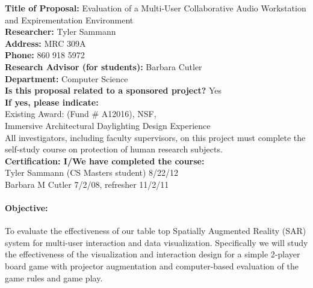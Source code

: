 \documentclass[10pt]{article}
\begin{document}
\noindent
{\bf Title of Proposal:}  Evaluation of a Multi-User Collaborative Audio Workstation and Expirementation Environment\\
{\bf Researcher:}   Tyler Sammann\\
{\bf Address:}  MRC 309A\\
{\bf Phone:} 860 918 5972\\
{\bf Research Advisor (for students):}  Barbara Cutler \\
{\bf Department:}  Computer Science \\
{\bf Is this proposal related to a sponsored project?}  Yes \\
{\bf If yes,  please indicate:}  \\
Existing Award: (Fund \# A12016), NSF, \\
Immersive Architectural Daylighting Design Experience \\

\noindent
All investigators, including faculty supervisors, on this project must
complete the self-study course on protection of human research
subjects. \\
{\bf Certification:  I/We have completed the course:} \\
Tyler Sammann (CS Masters student) 8/22/12 \\
Barbara M Cutler 7/2/08, refresher 11/2/11

\paragraph{Objective:}
%
To evaluate the effectiveness of our table top Spatially Augmented
Reality (SAR) system for multi-user interaction and data
visualization.  Specifically we will study the effectiveness of the
visualization and interaction design for a simple 2-player board game
with projector augmentation and computer-based evaluation of the game
rules and game play.
\end{document}

